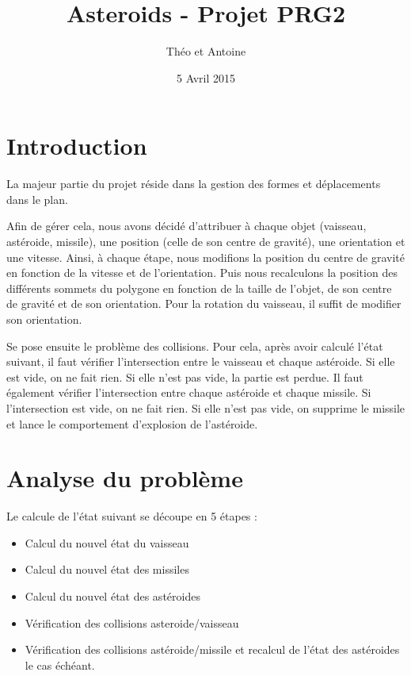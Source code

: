 \documentclass[a4paper,10pt,openany,oneside]{report}
\title{Asteroids - Projet PRG2}
\author{Théo \bsc{Nazé} et Antoine \bsc{Pinsard}}
\date{5 Avril 2015}
\begin{document}
\maketitle

\section{Introduction}

La majeur partie du projet réside dans la gestion des formes et déplacements
dans le plan.

Afin de gérer cela, nous avons décidé d'attribuer à chaque objet (vaisseau,
astéroide, missile), une position (celle de son centre de gravité), une
orientation et une vitesse. Ainsi, à chaque étape, nous modifions la position
du centre de gravité en fonction de la vitesse et de l'orientation. Puis nous
recalculons la position des différents sommets du polygone en fonction de la
taille de l'objet, de son centre de gravité et de son orientation. Pour la
rotation du vaisseau, il suffit de modifier son orientation.

Se pose ensuite le problème des collisions. Pour cela, après avoir calculé
l'état suivant, il faut vérifier l'intersection entre le vaisseau et chaque
astéroide. Si elle est vide, on ne fait rien. Si elle n'est pas vide, la partie
est perdue. Il faut également vérifier l'intersection entre chaque astéroide et
chaque missile. Si l'intersection est vide, on ne fait rien. Si elle n'est pas
vide, on supprime le missile et lance le comportement d'explosion de
l'astéroide.

\section{Analyse du problème}

Le calcule de l'état suivant se découpe en 5 étapes :

\begin{itemize}
  \item Calcul du nouvel état du vaisseau
  \item Calcul du nouvel état des missiles
  \item Calcul du nouvel état des astéroides
  \item Vérification des collisions asteroide/vaisseau
  \item Vérification des collisions astéroide/missile et recalcul de l'état des
    astéroides le cas échéant.
\end{itemize}
\end{document}
